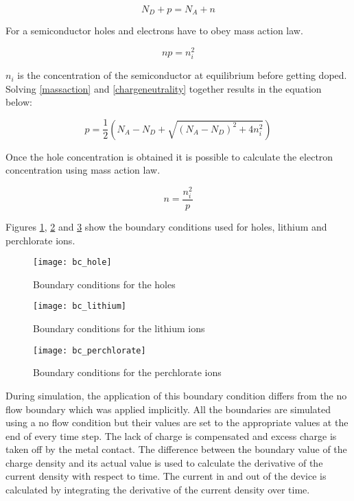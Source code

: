 \begin{doublespace}
\begin{equation}
N_{D} + p=N_{A} + n
\label{chargeneutrality}
\end{equation}

For a semiconductor holes and electrons have to obey mass action law.

\begin{equation}
np=n_i^2
\label{massaction}
\end{equation}

$n_i$ is the concentration of the semiconductor at equilibrium before getting doped. Solving \eqref{massaction} and \eqref{chargeneutrality} together results in the equation below:

\begin{equation}
p=\frac{1}{2}(N_A - N_D + \sqrt{(N_A - N_D)^2+4n_i^2})
\label{nbound}
\end{equation}

Once the hole concentration is obtained it is possible to calculate the electron concentration using mass action law.

\begin{equation}
n=\frac{n_i^2}{p}
\label{pbound}
\end{equation}

Figures \ref{bc_hole}, \ref{bc_lithium} and \ref{bc_perchlorate} show the boundary conditions used for holes, lithium and perchlorate ions.

\begin{figure}[!htp]
\centering
\texttt{[image: bc\_hole]}
\caption{Boundary conditions for the holes } 
\label{bc_hole}
\end{figure}

\begin{figure}[!htp]
\centering
\texttt{[image: bc\_lithium]}
\caption{Boundary conditions for the lithium ions } 
\label{bc_lithium}
\end{figure}

\begin{figure}[!htp]
\centering
\texttt{[image: bc\_perchlorate]}
\caption{Boundary conditions for the perchlorate ions } 
\label{bc_perchlorate}
\end{figure}


During simulation, the application of this boundary condition differs from the no flow boundary which was applied implicitly. All the boundaries are simulated using a no flow condition but their values are set to the appropriate values at the end of every time step. The lack of charge is compensated and excess charge is taken off by the metal contact. The difference between the boundary value of the charge density and its actual value is used to calculate the derivative of the current density with respect to time. The current in and out of the device is calculated by integrating the derivative of the current density over time. 


\end{doublespace}
